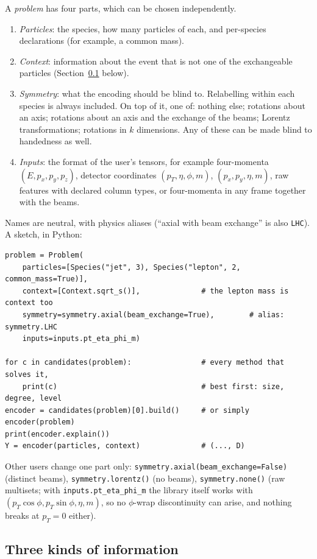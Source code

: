 \documentclass[11pt]{article}
\theoremstyle{definition}
\theoremstyle{remark}
\begin{document}
A \emph{problem} has four parts, which can be chosen independently.
\begin{enumerate}
  \item \emph{Particles}: the species, how many particles of each, and
    per-species declarations (for example, a common mass).
  \item \emph{Context}: information about the event that is not one of the
    exchangeable particles (Section~\ref{sec:context} below).
  \item \emph{Symmetry}: what the encoding should be blind to. Relabelling
    within each species is always included. On top of it, one of: nothing
    else; rotations about an axis; rotations about an axis and the exchange of
    the beams; Lorentz transformations; rotations in $k$ dimensions. Any of
    these can be made blind to handedness as well.
  \item \emph{Inputs}: the format of the user's tensors, for example
    four-momenta $(E, p_x, p_y, p_z)$, detector coordinates $(p_T, \eta, \phi,
    m)$, $(p_x, p_y, \eta, m)$, raw features with declared column types, or
    four-momenta in any frame together with the beams.
\end{enumerate}
Names are neutral, with physics aliases (``axial with beam exchange'' is also
\texttt{LHC}). A sketch, in Python:
\begin{verbatim}
problem = Problem(
    particles=[Species("jet", 3), Species("lepton", 2, common_mass=True)],
    context=[Context.sqrt_s()],              # the lepton mass is context too
    symmetry=symmetry.axial(beam_exchange=True),        # alias: symmetry.LHC
    inputs=inputs.pt_eta_phi_m)

for c in candidates(problem):                # every method that solves it,
    print(c)                                 # best first: size, degree, level
encoder = candidates(problem)[0].build()     # or simply encoder(problem)
print(encoder.explain())
Y = encoder(particles, context)              # (..., D)
\end{verbatim}
Other users change one part only: \texttt{symmetry.axial(beam\_exchange=False)}
(distinct beams), \texttt{symmetry.lorentz()} (no beams), \texttt{symmetry.none()}
(raw multisets; with \texttt{inputs.pt\_eta\_phi\_m} the library itself works
with $(p_T\cos\phi, p_T\sin\phi, \eta, m)$, so no $\phi$-wrap discontinuity
can arise, and nothing breaks at $p_T = 0$ either).

\subsection{Three kinds of information}\label{sec:context}
\end{document}
